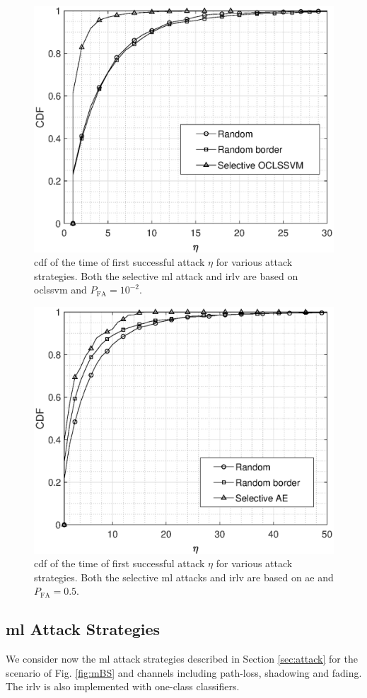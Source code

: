 \documentclass[draftcls,onecolumn,12pt]{IEEEtran}
\begin{document}
\begin{figure}[t]
    \centering
    \includegraphics[width=0.6\columnwidth]{res_selective_SVM.eps}
    \caption{\ac{cdf} of the time of first successful attack $\eta$ for various attack strategies. Both the selective \ac{ml} attack  and \ac{irlv} are based on \ac{oclssvm} and $P_{\text{FA}}= 10^{-2}$.}
    \label{fig:selectiveSVM}
\end{figure}

\begin{figure}[t]
    \centering
    \includegraphics[width=0.6\columnwidth]{res_selective_AE.eps}
    \caption{\ac{cdf} of the time of first successful attack $\eta$ for various attack strategies. Both the selective \ac{ml} attacks  and \ac{irlv} are based on \ac{ae} and $P_{\text{FA}}= 0.5$.}
    \label{fig:selectiveAE}
\end{figure}


\subsection{\ac{ml} Attack Strategies}

We consider now the \ac{ml} attack strategies described in Section \ref{sec:attack} for the scenario of Fig. \ref{fig:mBS} and channels including path-loss, shadowing and fading. The \ac{irlv} is also implemented with one-class classifiers. 
\end{document}
